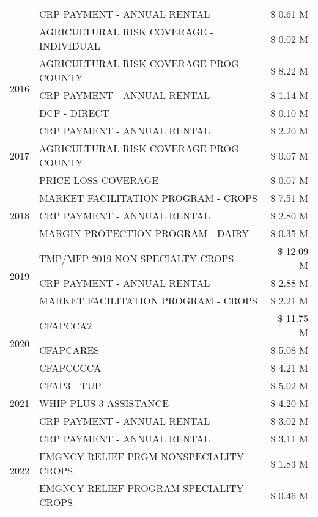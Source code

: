 \begin{tabular}{llr}
 & CRP PAYMENT - ANNUAL RENTAL & \$ 0.61 M \\
 & AGRICULTURAL RISK COVERAGE - INDIVIDUAL & \$ 0.02 M \\
\cline{1-3}
\multirow[t]{3}{*}{2016} & AGRICULTURAL RISK COVERAGE PROG - COUNTY & \$ 8.22 M \\
 & CRP PAYMENT - ANNUAL RENTAL & \$ 1.14 M \\
 & DCP - DIRECT & \$ 0.10 M \\
\cline{1-3}
\multirow[t]{3}{*}{2017} & CRP PAYMENT - ANNUAL RENTAL & \$ 2.20 M \\
 & AGRICULTURAL RISK COVERAGE PROG - COUNTY & \$ 0.07 M \\
 & PRICE LOSS COVERAGE & \$ 0.07 M \\
\cline{1-3}
\multirow[t]{3}{*}{2018} & MARKET FACILITATION PROGRAM - CROPS & \$ 7.51 M \\
 & CRP PAYMENT - ANNUAL RENTAL & \$ 2.80 M \\
 & MARGIN PROTECTION PROGRAM - DAIRY & \$ 0.35 M \\
\cline{1-3}
\multirow[t]{3}{*}{2019} & TMP/MFP 2019 NON SPECIALTY CROPS & \$ 12.09 M \\
 & CRP PAYMENT - ANNUAL RENTAL & \$ 2.88 M \\
 & MARKET FACILITATION PROGRAM - CROPS & \$ 2.21 M \\
\cline{1-3}
\multirow[t]{3}{*}{2020} & CFAPCCA2 & \$ 11.75 M \\
 & CFAPCARES & \$ 5.08 M \\
 & CFAPCCCCA & \$ 4.21 M \\
\cline{1-3}
\multirow[t]{3}{*}{2021} & CFAP3 - TUP & \$ 5.02 M \\
 & WHIP PLUS 3 ASSISTANCE & \$ 4.20 M \\
 & CRP PAYMENT - ANNUAL RENTAL & \$ 3.02 M \\
\cline{1-3}
\multirow[t]{3}{*}{2022} & CRP PAYMENT - ANNUAL RENTAL & \$ 3.11 M \\
 & EMGNCY RELIEF PRGM-NONSPECIALITY CROPS & \$ 1.83 M \\
 & EMGNCY RELIEF PROGRAM-SPECIALITY CROPS & \$ 0.46 M \\
\cline{1-3}
\bottomrule
\end{tabular}

